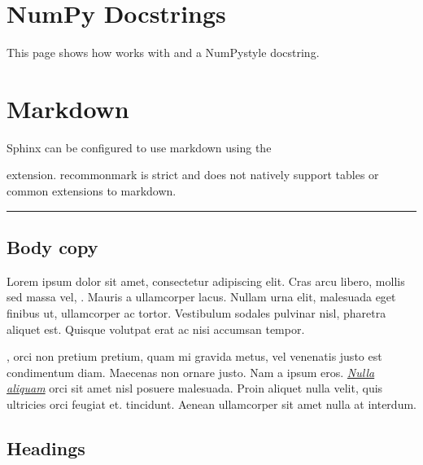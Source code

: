 \documentclass[letterpaper,10pt,english]{sphinxmanual}
\begin{document}
\section{NumPy Docstrings}
\label{\detokenize{numpydoc:numpy-docstrings}}\label{\detokenize{numpydoc::doc}}
This page shows how  works with  and a
NumPy\sphinxhyphen{}style docstring.


\section{Markdown}
\label{\detokenize{markdown:markdown}}\label{\detokenize{markdown::doc}}
Sphinx can be configured to use markdown using the %
\begin{footnote}[7]\sphinxAtStartFootnote
{}
%
\end{footnote}
extension. recommonmark is strict and does not natively support tables or common extensions
to markdown.


\bigskip\hrule\bigskip



\subsection{Body copy}
\label{\detokenize{markdown:body-copy}}
Lorem ipsum dolor sit amet, consectetur adipiscing elit. Cras arcu libero,
mollis sed massa vel, . Mauris a ullamcorper lacus. Nullam
urna elit, malesuada eget finibus ut, ullamcorper ac tortor. Vestibulum sodales
pulvinar nisl, pharetra aliquet est. Quisque volutpat erat ac nisi accumsan
tempor.

, orci non pretium pretium, quam mi gravida metus, vel
venenatis justo est condimentum diam. Maecenas non ornare justo. Nam a ipsum
eros. {\hyperref[\detokenize{markdown:}]{\emph{Nulla aliquam}}} orci sit amet nisl posuere malesuada. Proin aliquet
nulla velit, quis ultricies orci feugiat et. 
tincidunt. Aenean ullamcorper sit amet nulla at interdum.


\subsection{Headings}
\label{\detokenize{markdown:headings}}
\end{document}
